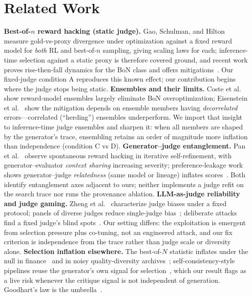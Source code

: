\documentclass[sigconf]{acmart}
\begin{document}
\section{Related Work}
\textbf{Best-of-$n$ reward hacking (static judge).} Gao, Schulman, and Hilton~\cite{gao2023} measure gold-vs-proxy divergence under optimization against a fixed reward model for \emph{both} RL and best-of-$n$ sampling, giving scaling laws for each; inference-time selection against a static proxy is therefore covered ground, and recent work proves rise-then-fall dynamics for the BoN class and offers mitigations~\cite{itrh2025}. Our fixed-judge condition A reproduces this known effect; our contribution begins where the judge stops being static.
\textbf{Ensembles and their limits.} Coste et al.~\cite{coste2024} show reward-model ensembles largely eliminate BoN overoptimization; Eisenstein et al.~\cite{eisenstein2023} show the mitigation depends on ensemble members having \emph{decorrelated} errors---correlated (``herding'') ensembles underperform. We import that insight to inference-time judge ensembles and sharpen it: when all members are shaped by the generator's trace, ensembling retains an order of magnitude more inflation than independence (condition C vs D).
\textbf{Generator--judge entanglement.} Pan et al.~\cite{pan2024} observe spontaneous reward hacking in iterative self-refinement, with generator--evaluator \emph{context sharing} increasing severity; preference-leakage work shows generator--judge \emph{relatedness} (same model or lineage) inflates scores~\cite{prefleak2025}. Both identify entanglement axes adjacent to ours; neither implements a judge refit on the search trace nor runs the provenance ablation.
\textbf{LLM-as-judge reliability and judge gaming.} Zheng et al.~\cite{zheng2023} characterize judge biases under a fixed protocol; panels of diverse judges reduce single-judge bias~\cite{poll2024}; deliberate attacks find a fixed judge's blind spots~\cite{cheating2025,judgedeceiver2024}. Our setting differs: the exploitation is emergent from selection pressure plus co-tuning, not an engineered attack, and our fix criterion is independence from the trace rather than judge scale or diversity alone.
\textbf{Selection inflation elsewhere.} The best-of-$N$ statistic inflates under the null in finance~\cite{bailey2014dsr,stw1999} and in noisy quality-diversity archives~\cite{flageat2025}; self-consistency-style pipelines reuse the generator's own signal for selection~\cite{wang2022}, which our result flags as a live risk whenever the critique signal is not independent of generation. Goodhart's law is the umbrella~\cite{goodhart1975}.
\end{document}
